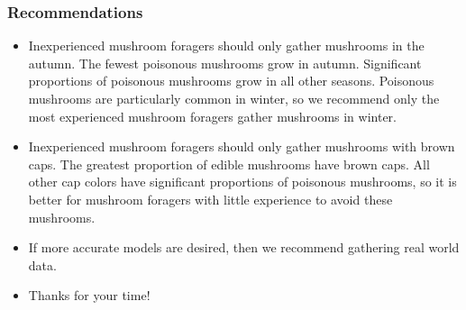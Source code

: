 \documentclass[]{beamer}
\begin{document}
\begin{frame}
\frametitle{Recommendations}
\begin{itemize}
\pause
\item Inexperienced mushroom foragers should only gather mushrooms in the autumn. The fewest poisonous mushrooms grow in autumn. Significant proportions of poisonous mushrooms grow in all other seasons. Poisonous mushrooms are particularly common in winter, so we recommend only the most experienced mushroom foragers gather mushrooms in winter.
\pause
\item Inexperienced mushroom foragers should only gather mushrooms with brown caps. The greatest proportion of edible mushrooms have brown caps. All other cap colors have significant proportions of poisonous mushrooms, so it is better for mushroom foragers with little experience to avoid these mushrooms.
\pause
\item If more accurate models are desired, then we recommend gathering real world data.
\pause
\item Thanks for your time!
\end{itemize}
\end{frame}
\end{document}
